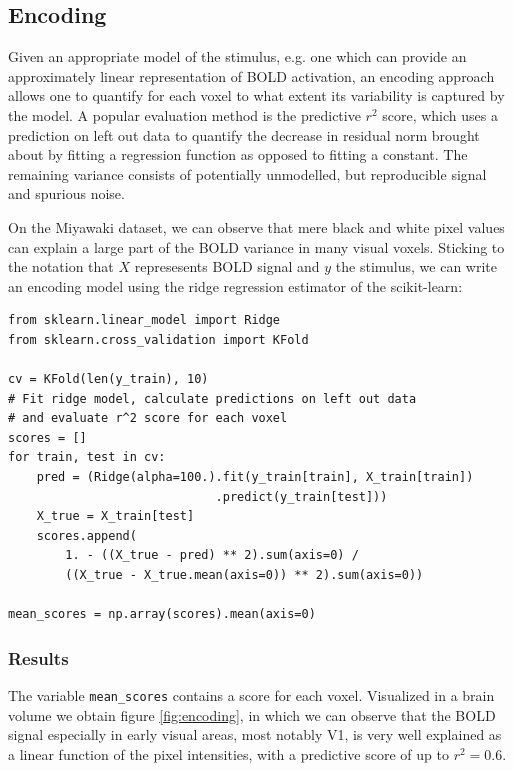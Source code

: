 \documentclass{frontiersSCNS} %
\begin{document}
\subsection{Encoding}
Given an appropriate model of the stimulus, e.g. one which can provide an approximately linear representation of BOLD activation, an encoding approach allows one to quantify for each voxel to what extent its variability is captured by the model. A popular evaluation method is the predictive \(r^2\) score, which uses a prediction on left out data to quantify the decrease in residual norm brought about by fitting a regression function as opposed to fitting a constant. %
The remaining variance consists of potentially unmodelled, but reproducible signal and spurious noise.

On the Miyawaki dataset, we can observe that mere black and white pixel values can explain a large part of the BOLD variance in many visual voxels. Sticking to the notation that \(X\) represesents BOLD signal and \(y\) the stimulus, we can write an encoding model using the ridge regression estimator of the scikit-learn:

\begin{lstlisting}
from sklearn.linear_model import Ridge
from sklearn.cross_validation import KFold

cv = KFold(len(y_train), 10)
# Fit ridge model, calculate predictions on left out data
# and evaluate r^2 score for each voxel
scores = []
for train, test in cv:
    pred = (Ridge(alpha=100.).fit(y_train[train], X_train[train])
                             .predict(y_train[test]))
    X_true = X_train[test]
    scores.append(
        1. - ((X_true - pred) ** 2).sum(axis=0) /
        ((X_true - X_true.mean(axis=0)) ** 2).sum(axis=0))
    
mean_scores = np.array(scores).mean(axis=0)
\end{lstlisting}

\subsubsection{Results}
The variable \texttt{mean\_scores} contains a score for each voxel. Visualized in a brain volume we obtain figure \ref{fig:encoding}, in which we can observe that the BOLD signal especially in early visual areas, most notably V1, is very well explained as a linear function of the pixel intensities, with a predictive score of up to \(r^2 = 0.6\).
\end{document}
